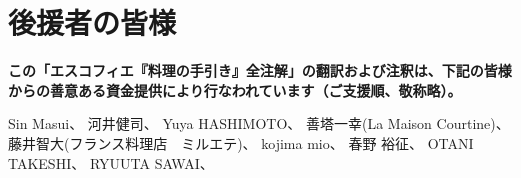 \hypertarget{benefactors}{%
\section{後援者の皆様}\label{benefactors}}

\thispagestyle{empty}

\small

\textbf{この「エスコフィエ『料理の手引き』全注解」の翻訳および注釈は、下記の皆様からの善意ある資金提供により行なわれています（ご支援順、敬称略）。}

\normalsize
\vspace{1\zw}

Sin Masui、\href{20180524-23h,2x,novelsoundsmail@gmail.com}{}
河井健司、\href{20180525-0h14,10x,kwibeng@gmail.com}{} Yuya
HASHIMOTO、\href{20180525-1h40,2x,hashimo0910@gmail.com}{} 善塔一幸(La
Maison
Courtine)、\href{20180525-8h56,10x,kazuyukizento120@docomo.ne.jp}{}
藤井智大(フランス料理店　ミルエテ)、\href{20180525-10h07,1x,apple19761019@yahoo.co.jp}{}
kojima mio、\href{20180525-12h23,1x,teeeeshow@yahoo.co.jp}{} 春野
裕征、\href{20180528-2h41,1x,amanojack.v-o-v@i.softbank.jp}{} OTANI
TAKESHI、\href{20180529-17h26,2x,1000feuille@ezweb.ne.jp}{} RYUUTA
SAWAI、\href{20180530-2h57.1x,rs.ajtk.zz@i.softbank.jp}{}
